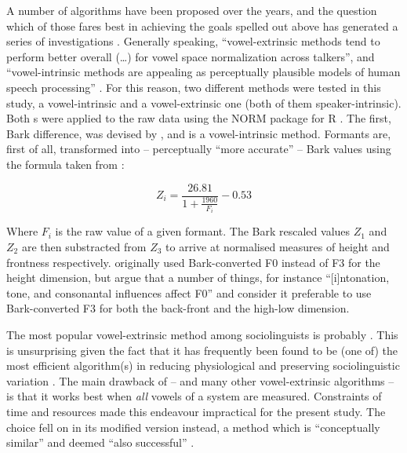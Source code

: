 A number of algorithms have been proposed over the years, and the question which of those fares best in achieving the goals spelled out above has generated a series of investigations \parencites(among others:)(){hindle1978}{disner1980}{adanketal2004}.
Generally speaking, ``vowel-extrinsic methods tend to perform better overall (\ldots) for vowel space normalization across talkers'', and ``vowel-intrinsic methods are appealing as perceptually plausible models of human speech processing'' \parencite[1440]{clopper2009}.
For this reason, two different  methods were tested in this study, a vowel-intrinsic and a vowel-extrinsic one (both of them speaker-intrinsic).
Both s were applied to the raw data using the NORM package for R \parencite{kendallthomas2014}.
The first, Bark difference, was devised by \textcite{syrdalgopal1986}, and is a vowel-intrinsic method.
Formants are, first of all, transformed into -- perceptually ``more accurate'' \parencite[1431--1432]{clopper2009} -- Bark values using the formula taken from \textcite{traunmueller1990}:

\begin{equation}
	Z_{i} = \frac{26.81}{1 + \frac{1960}{F_{i}}} - 0.53
\end{equation}

Where \(F_{i}\) is the raw value of a given formant. The Bark rescaled values \(Z_{1}\) and \(Z_{2}\) are then substracted from \(Z_{3}\) to arrive at normalised measures of height and frontness respectively. \citeauthor{syrdalgopal1986} originally used Bark-converted F0 instead of F3 for the height dimension, but \textcite{kendallthomas2014} argue that a number of things, for instance ``[i]ntonation, tone, and consonantal influences affect F0'' and consider it preferable to use Bark-converted F3 for both the back-front and the high-low dimension.

The most popular vowel-extrinsic  method among sociolinguists is probably \textcite{lobanov1971}.
This is unsurprising given the fact that it has frequently been found to be (one of) the most efficient algorithm(s) in reducing physiological and preserving sociolinguistic variation \parencite[cf.][1440]{clopper2009}.
The main drawback of \citeauthor{lobanov1971} -- and many other vowel-extrinsic algorithms -- is that it works best when \emph{all} vowels of a system are measured.
Constraints of time and resources made this endeavour impractical for the present study.
The choice fell on \textcite{wattfabricius2002} in its modified version \parencite{fabriciusetal2009} instead, a method which is ``conceptually similar'' and deemed ``also successful'' \parencite[1440]{clopper2009}.

